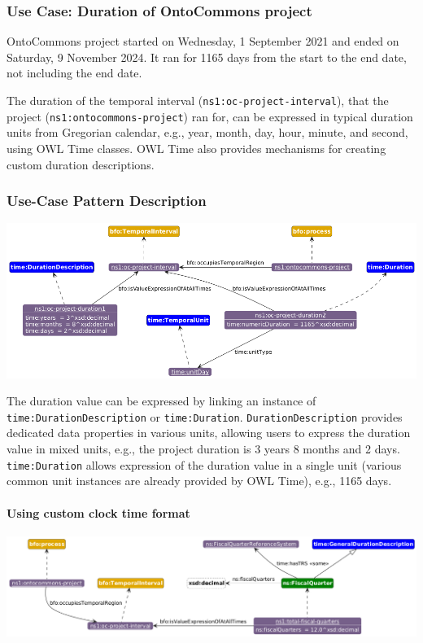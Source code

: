 \subsubsection*{Use Case: Duration of OntoCommons project} 
OntoCommons project started on Wednesday, 1 September 2021 and ended on Saturday, 9 November 2024. It ran for 1165 days from the start to the end date, not including the end date.

The duration of the temporal interval (\texttt{ns1:oc-project-interval}), that the project (\texttt{ns1:ontocommons-project}) ran for, can be expressed in typical duration units from Gregorian calendar, e.g., year, month, day, hour, minute, and second, using OWL Time classes. OWL Time also provides mechanisms for creating custom duration descriptions. 

\subsubsection*{Use-Case Pattern Description}

\includegraphics[scale=0.40]{scenarios/time-duration/image/uc1-time-duration.png}

The duration value can be expressed by linking an instance of \texttt{time:DurationDescription} or \texttt{time:Duration}. \texttt{DurationDescription} provides dedicated data properties in various units, allowing users to express the duration value in mixed units, e.g., the project duration is 3 years 8 months and 2 days. \texttt{time:Duration} allows expression of the duration value in a single unit (various common unit instances are already provided by OWL Time), e.g., 1165 days.

\paragraph{Using custom clock time format \\}

\includegraphics[scale=0.38]{scenarios/time-duration/image/uc2-custom-duration.png}

